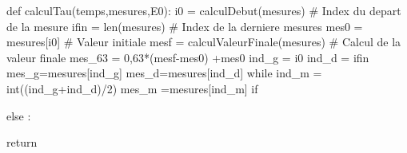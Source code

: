 \documentclass[10pt]{article}
\newif\ifprof
\begin{document}
\ifprof
\begin{corrige}
\begin{py}
\begin{minipage}[c]{.05\linewidth}
\end{minipage}\hfill
\begin{minipage}[c]{.95\linewidth}
\begin{python}
def calculTau(temps,mesures,E0):
    i0 = calculDebut(mesures)               # Index du depart de la mesure
    ifin = len(mesures)                     # Index de la derniere mesures   
    mes0 = mesures[i0]                     # Valeur initiale
    mesf = calculValeurFinale(mesures)     # Calcul de la valeur finale
    mes_63 = 0,63*(mesf-mes0)+mes0
    
    ind_g = i0
    ind_d = ifin
    mes_g=mesures[ind_g]
    mes_d=mesures[ind_d]

    while ind_g-ind_d>2:
        ind_m = int((ind_g+ind_d)/2)
        mes_m =mesures[ind_m]
        if mes_m <= mes_63 :
            ind_g = ind_m

        else :
            ind_d = ind_m
    
    return temps[ind_m]-temps[i0]
\end{python}
\end{minipage}
\end{py}
\end{corrige}
\else
\begin{py}
\begin{minipage}[c]{.05\linewidth}
\end{minipage}\hfill
\begin{minipage}[c]{.95\linewidth}
\begin{python}
def calculTau(temps,mesures,E0):
    i0 = calculDebut(mesures)               # Index du depart de la mesure
    ifin = len(mesures)                     # Index de la derniere mesures   
    mes0 = mesures[i0]                     # Valeur initiale
    mesf = calculValeurFinale(mesures)     # Calcul de la valeur finale
    mes_63 = 0,63*(mesf-mes0) +mes0
    ind_g = i0
    ind_d = ifin
    mes_g=mesures[ind_g]
    mes_d=mesures[ind_d] 
    while 
        ind_m = int((ind_g+ind_d)/2)
        mes_m =mesures[ind_m]
        if 
            
            
        else :
            
            
    return 
\end{python}
\end{minipage}
\end{py}
\fi
\end{document}
